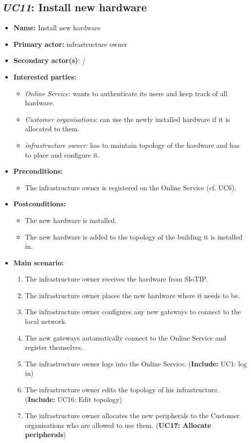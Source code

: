 \documentclass[english]{sareport}
\begin{document}
\subsection{\emph{UC11}: Install new hardware}
\begin{itemize}
    \item \textbf{Name:} Install new hardware
    \item \textbf{Primary actor:} infrastructure owner
    \item \textbf{Secondary actor(s)}: /
    \item \textbf{Interested parties:} 
        \begin{itemize}
            \item \textit{Online Service:}  wants to authenticate its users and keep track of all hardware.
            \item \textit{Customer organisations:} can use the newly installed hardware if it is allocated to them.
            \item \textit{infrastructure owner:} has to maintain topology of the hardware and has to place and configure it.
        \end{itemize}

    \item \textbf{Preconditions:}
        \begin{itemize}
            \item The infrastructure owner is registered on the Online Service (cf. UC6).
        \end{itemize}

    \item \textbf{Postconditions:}
        \begin{itemize}
            \item The new hardware is installed.
            \item The new hardware is added to the topology of the building it is installed in.
        \end{itemize}
        
    \item \textbf{Main scenario:} 
    \begin{enumerate}
       \item The infrastructure owner receives the hardware from SIoTIP.
       \item The infrastructure owner places the new hardware where it needs to be.
       \item The infrastructure owner configures any new gateways to connect to the local network.
       \item The new gateways automatically connect to the Online Service and register themselves.
       \item The infrastructure owner logs into the Online Service. (\textbf{Include:} UC1: log in)
       \item The infrastructure owner edits the topology of his infrastructure. (\textbf{Include:} UC16: Edit topology)
       \item The infrastructure owner allocates the new peripherals to the Customer organisations who are allowed to use them. (\textbf{UC17: Allocate peripherals})
    \end{enumerate}
\end{itemize}
\end{document}
